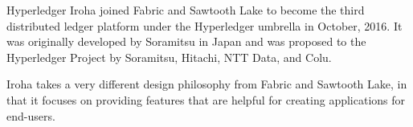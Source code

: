 Hyperledger Iroha joined Fabric and Sawtooth Lake to become the third distributed ledger platform under the Hyperledger umbrella in October, 2016. It was originally developed by Soramitsu in Japan and was proposed to the Hyperledger Project by Soramitsu, Hitachi, NTT Data, and Colu.

Iroha takes a very different design philosophy from Fabric and Sawtooth Lake, in that it focuses on providing features that are helpful for creating applications for end-users. 
